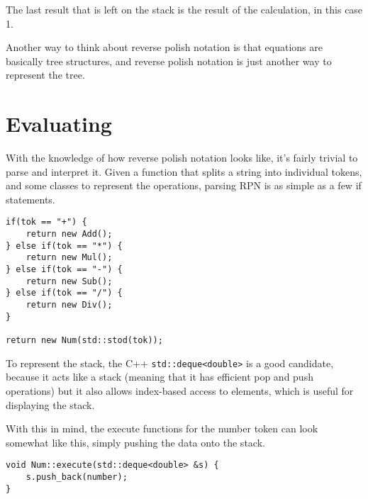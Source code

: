 \documentclass[a4paper,twocolumn]{article}
\begin{document}
The last result that is left on the stack is the result of the calculation, in this case 1.

Another way to think about reverse polish notation is that equations are basically tree structures, and reverse polish notation is just another way to represent the tree.

\begin{center}
\end{center}

\section{Evaluating}

With the knowledge of how reverse polish notation looks like, it's fairly trivial to parse and interpret it. Given a function that splits a string into individual tokens, and some classes to represent the operations, parsing RPN is as simple as a few if statements.

\begin{verbatim}
if(tok == "+") {
    return new Add();
} else if(tok == "*") {
    return new Mul();
} else if(tok == "-") {
    return new Sub();
} else if(tok == "/") {
    return new Div();
}

return new Num(std::stod(tok));
\end{verbatim}

To represent the stack, the C++ \verb|std::deque<double>| is a good candidate, because it acts like a stack (meaning that it has efficient pop and push operations) but it also allows index-based access to elements, which is useful for displaying the stack.

With this in mind, the execute functions for the number token can look somewhat like this, simply pushing the data onto the stack.

\begin{verbatim}
void Num::execute(std::deque<double> &s) {                                                                                                                                                           
    s.push_back(number);                                                                                                                                                                                
}  
\end{verbatim}
\end{document}
